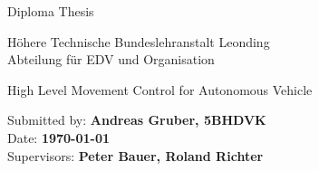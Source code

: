 \cfoot{}
\begin{titlepage}
\thispagestyle{fancy}

\begin{center}

\vspace*{8em}

{\LARGE Diploma Thesis}

\vspace{2em}

{\large H\"ohere Technische Bundeslehranstalt Leonding \\[.5em]
Abteilung f\"ur EDV und Organisation}

\vspace{8em}

{\Huge High Level Movement Control for Autonomous Vehicle}
\end{center}

\vspace{18em}

Submitted by: {\bf Andreas Gruber, 5BHDVK} \\[.5em]

Date: {\bf \today} \\[.5em]

Supervisors: {\bf Peter Bauer, Roland Richter}
\end{titlepage}